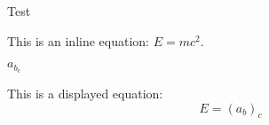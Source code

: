 \documentclass[
textsize=14pt,
mathsize=20pt,
]{class}
\begin{document}
Test

This is an inline equation: \( E = mc
^2 \).

$a_{b_c}$


This is a displayed equation:
\[
E = (a_b)_c
\]

\lipsum[1]
\end{document}
